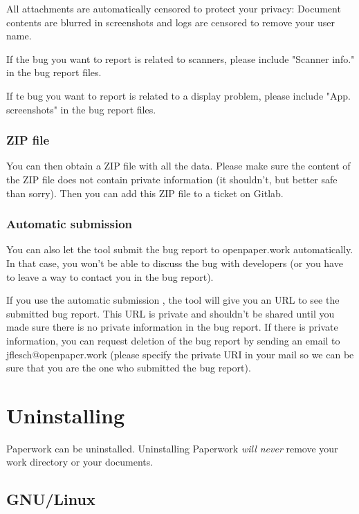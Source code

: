 \documentclass[10pt,a4paper]{article}
\begin{document}
All attachments are automatically censored to protect your privacy: Document
contents are blurred in screenshots and logs are censored to remove your user
name.

If the bug you want to report is related to scanners, please include
"Scanner info." in the bug report files.

If te bug you want to report is related to a display problem, please include
"App. screenshots" in the bug report files.


\subsubsection{ZIP file}

You can then obtain a ZIP file with all the data. Please make sure the content
of the ZIP file does not contain private information (it shouldn't, but better
safe than sorry). Then you can add this ZIP file to a ticket on Gitlab.


\subsubsection{Automatic submission}

You can also let the tool submit the bug report to openpaper.work
automatically. In that case, you won't be able to discuss the bug with
developers (or you have to leave a way to contact you in the bug report).

If you use the automatic submission , the tool will give you an URL to see the
submitted bug report. This URL is private and shouldn't be shared until you
made sure there is no private information in the bug report. If there is
private information, you can request deletion of the bug report by sending an
email to jflesch@openpaper.work (please specify the private URI in your mail
so we can be sure that you are the one who submitted the bug report).


\section{Uninstalling}

Paperwork can be uninstalled. Uninstalling Paperwork \emph{will never}
remove your work directory or your documents.

\subsection{GNU/Linux}
\end{document}
